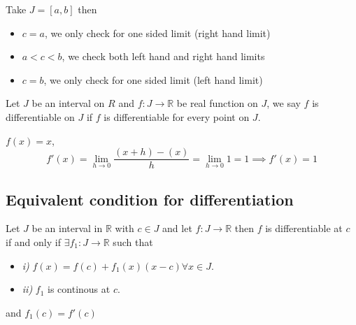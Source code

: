 \documentclass[11pt,a4paper]{colorart}
\def\R{\mathbb{R}}
\def\ra{\rightarrow}
\begin{document}
\begin{remark}
	Take $J = [a,b]$ then
	\begin{itemize}
		\item $c=a$, we only check for one sided limit (right hand limit)
		\item $a<c<b$, we check both left hand and right hand limits
		\item $c=b$, we only check for one sided limit (left hand limit)
	\end{itemize}
\end{remark}

\begin{definition}
	Let $J$ be an interval on $R$ and $f:J \ra \R$ be real function on $J$, we say $f$ is differentiable on $J$ if $f$ is differentiable for every point on $J$.
\end{definition}

\begin{example}
	$f(x) = x$, 
	\[ f'(x) = \lim_{h \to 0} \frac{ (x+h) - (x) }{ h} 
	   = \lim_{h \to 0} 1 = 1 \implies f'(x) = 1 \]
\end{example}

\subsection{Equivalent condition for differentiation}

\begin{theorem}
	Let $J$ be an interval in $\R$ with $c \in J$ and let $f:J \ra \R$ then $f$ is differentiable at $c$ if and only if $\exists f_1:J \ra \R$ such that
	\begin{itemize}
		\item \textit{i)} $f(x) = f(c) + f_1(x)  (x-c) \forall x \in J$.
		\item \textit{ii)} $f_1$ is continous at $c$.
	\end{itemize}
	and $f_1(c) = f'(c)$
\end{theorem}
\end{document}
